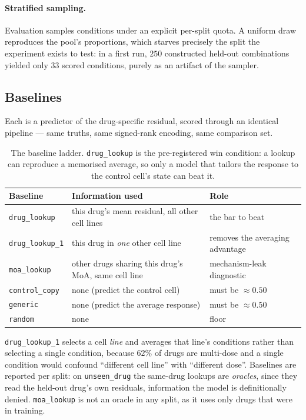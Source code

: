 \paragraph{Stratified sampling.} Evaluation samples conditions under an explicit per-split quota. A
uniform draw reproduces the pool's proportions, which starves precisely the split the experiment
exists to test: in a first run, $250$ constructed held-out combinations yielded only $33$ scored
conditions, purely as an artifact of the sampler.

\subsection{Baselines}
\label{sec:methods-baselines}

Each is a predictor of the drug-specific residual, scored through an identical pipeline --- same
truths, same signed-rank encoding, same comparison set.

\begin{table}[h]
\centering
\begin{tabular}{lll}
\toprule
Baseline & Information used & Role \\
\midrule
\texttt{drug\_lookup}   & this drug's mean residual, all other cell lines & the bar to beat \\
\texttt{drug\_lookup\_1} & this drug in \emph{one} other cell line & removes the averaging advantage \\
\texttt{moa\_lookup}    & other drugs sharing this drug's MoA, same cell line & mechanism-leak diagnostic \\
\texttt{control\_copy}  & none (predict the control cell) & must be $\approx 0.50$ \\
\texttt{generic}        & none (predict the average response) & must be $\approx 0.50$ \\
\texttt{random}         & none & floor \\
\bottomrule
\end{tabular}
\caption{The baseline ladder. \texttt{drug\_lookup} is the pre-registered win condition: a lookup
can reproduce a memorised average, so only a model that tailors the response to the control cell's
state can beat it.}
\label{tab:baselines}
\end{table}

\texttt{drug\_lookup\_1} selects a cell \emph{line} and averages that line's conditions rather than
selecting a single condition, because $62\%$ of drugs are multi-dose and a single condition would
confound ``different cell line'' with ``different dose''. Baselines are reported per split: on
\texttt{unseen\_drug} the same-drug lookups are \emph{oracles}, since they read the held-out drug's
own residuals, information the model is definitionally denied. \texttt{moa\_lookup} is not an oracle
in any split, as it uses only drugs that were in training.

